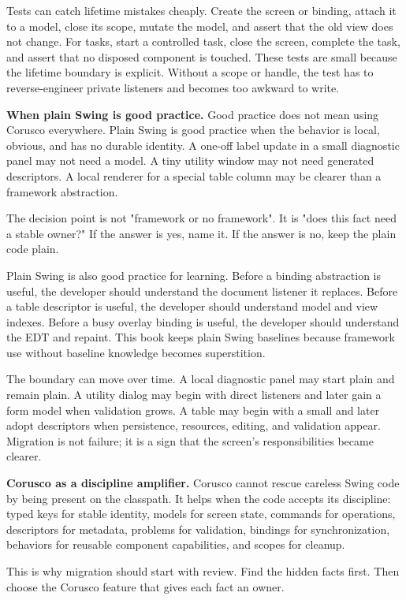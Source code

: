 Tests can catch lifetime mistakes cheaply. Create the screen or binding, attach
it to a model, close its scope, mutate the model, and assert that the old view
does not change. For tasks, start a controlled task, close the screen, complete
the task, and assert that no disposed component is touched. These tests are
small because the lifetime boundary is explicit. Without a scope or handle, the
test has to reverse-engineer private listeners and becomes too awkward to write.

\textbf{When plain Swing is good practice.}
Good practice does not mean using Corusco everywhere. Plain Swing is good practice when the behavior is local, obvious, and has no durable identity. A one-off label update in a small diagnostic panel may not need a model. A tiny utility window may not need generated descriptors. A local renderer for a special table column may be clearer than a framework abstraction.

The decision point is not "framework or no framework". It is "does this fact need a stable owner?" If the answer is yes, name it. If the answer is no, keep the plain code plain.

Plain Swing is also good practice for learning. Before a binding abstraction is
useful, the developer should understand the document listener it replaces.
Before a table descriptor is useful, the developer should understand model and
view indexes. Before a busy overlay binding is useful, the developer should
understand the EDT and repaint. This book keeps plain Swing baselines because
framework use without baseline knowledge becomes superstition.

The boundary can move over time. A local diagnostic panel may start plain and
remain plain. A utility dialog may begin with direct listeners and later gain a
form model when validation grows. A table may begin with a small
 and later adopt descriptors when persistence,
resources, editing, and validation appear. Migration is not failure; it is a
sign that the screen's responsibilities became clearer.

\textbf{Corusco as a discipline amplifier.}
Corusco cannot rescue careless Swing code by being present on the classpath. It helps when the code accepts its discipline: typed keys for stable identity, models for screen state, commands for operations, descriptors for metadata, problems for validation, bindings for synchronization, behaviors for reusable component capabilities, and scopes for cleanup.

This is why migration should start with review. Find the hidden facts first. Then choose the Corusco feature that gives each fact an owner.

